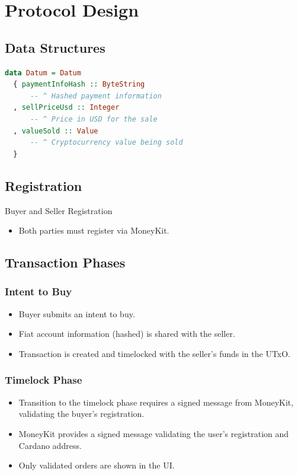 \documentclass[11pt,oneside,a4paper]{article}
\begin{document}
\section{Protocol Design}

\subsection{Data Structures}

\begin{lstlisting}[language=Haskell]
data Datum = Datum
  { paymentInfoHash :: ByteString
      -- ^ Hashed payment information
  , sellPriceUsd :: Integer
      -- ^ Price in USD for the sale
  , valueSold :: Value
      -- ^ Cryptocurrency value being sold
  }
\end{lstlisting}

\subsection{Registration}
Buyer and Seller Registration
\begin{itemize}
    \item Both parties must register via MoneyKit.

\end{itemize}

\subsection{Transaction Phases}

\subsubsection{Intent to Buy}

\begin{itemize}
    \item Buyer submits an intent to buy.
    \item Fiat account information (hashed) is shared with the seller.
    \item Transaction is created and timelocked with the seller's funds in the UTxO.
\end{itemize}

\subsubsection{Timelock Phase}

\begin{itemize}
    \item Transition to the timelock phase requires a signed message from MoneyKit, validating the buyer's registration.
    \item MoneyKit provides a signed message validating the user's registration and Cardano address.
    \item Only validated orders are shown in the UI.
\end{itemize}
\end{document}
